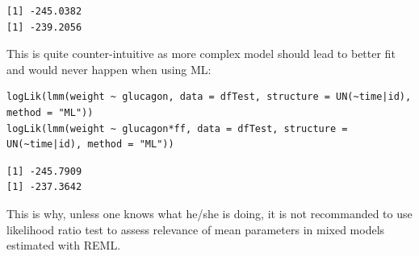 \documentclass[12pt]{article}
\begin{document}
\begin{verbatim}
[1] -245.0382
[1] -239.2056
\end{verbatim}


This is quite counter-intuitive as more complex model should lead to
better fit and would never happen when using ML:
\lstset{language=r,label= ,caption= ,captionpos=b,numbers=none}
\begin{lstlisting}
logLik(lmm(weight ~ glucagon, data = dfTest, structure = UN(~time|id), method = "ML"))
logLik(lmm(weight ~ glucagon*ff, data = dfTest, structure = UN(~time|id), method = "ML"))
\end{lstlisting}

\begin{verbatim}
[1] -245.7909
[1] -237.3642
\end{verbatim}


This is why, unless one knows what he/she is doing, it is not
recommanded to use likelihood ratio test to assess relevance of mean
parameters in mixed models estimated with REML.
\end{document}
